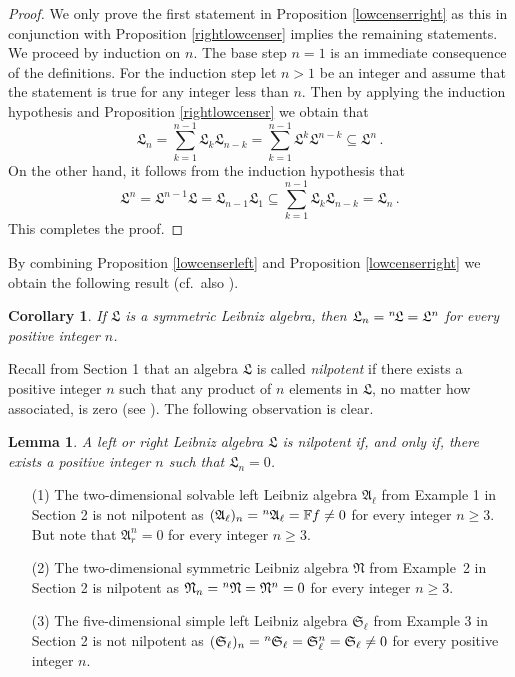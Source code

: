 \documentclass{amsart}
\newtheorem{lem}[thm]{Lemma}
\newtheorem{cor}[thm]{Corollary}
\numberwithin{equation}{section}
\newcommand{\F}{\mathbb{F}}
\newcommand{\af}{\mathfrak{A}}
\newcommand{\Sf}{\mathfrak{S}}
\newcommand{\lf}{\mathfrak{L}}
\newcommand{\nf}{\mathfrak{N}}
\begin{document}
\begin{proof}
We only prove the first statement in Proposition \ref{lowcenserright} as this in conjunction
with Proposition \ref{rightlowcenser} implies the remaining statements. We proceed by induction
on $n$. The base step $n=1$ is an immediate consequence of the definitions. For the induction
step let $n>1$ be an integer and assume that the statement is true for any integer less than
$n$. Then by applying the induction hypothesis and Proposition \ref{rightlowcenser} we obtain
that $$\lf_n=\sum_{k=1}^{n-1}\lf_k\lf_{n-k}=\sum_{k=1}^{n-1}\lf^k\lf^{n-k}\subseteq\lf^n
\,.$$ On the other hand, it follows from the induction hypothesis that $$\lf^n=\lf^{n-1}\lf=
\lf_{n-1}\lf_1\subseteq\sum_{k=1}^{n-1}\lf_k\lf_{n-k}=\lf_n\,.$$ This completes the proof.
\end{proof}

By combining Proposition \ref{lowcenserleft} and Proposition \ref{lowcenserright} we obtain the
following result (cf.\ also \cite[Proposition 2.13]{BH}).

\begin{cor}\label{lowcenser}
If $\lf$ is a symmetric Leibniz algebra, then $\lf_n=\hspace{.1mm}^n\hspace{-.5mm}\lf=\lf^n$
for every positive integer $n$.
\end{cor}

Recall from Section 1 that an algebra $\lf$ is called {\em nilpotent\/} if there exists a positive
integer $n$ such that any product of $n$ elements in $\lf$, no matter how associated, is zero
(see \cite[p. 18]{S}). The following observation is clear.

\begin{lem}\label{defnilp}
A left or right Leibniz algebra $\lf$ is nilpotent if, and only if, there exists a positive integer $n$
such that $\lf_n=0$.
\end{lem}

\begin{enumerate}
\item[(1)] The two-dimensional solvable left Leibniz algebra $\af_\ell$ from Example 1 in Section
                2 is not nilpotent as $(\af_\ell)_n=\hspace{.1mm}^n\hspace{-.1mm}\af_\ell=\F f\ne
                0$ for every integer $n\ge 3$. But note that $\af_r^n=0$ for every integer $n\ge 3$.
\item[(2)] The two-dimensional symmetric Leibniz algebra $\nf$ from Example~2 in Section 2 is
                nilpotent as $\nf_n=\hspace{.1mm}^n\hspace{-.1mm}\nf=\nf^n=0$ for every integer
                $n\ge 3$.
\item[(3)] The five-dimensional simple left Leibniz algebra $\Sf_\ell$ from Example 3 in Section 2
                 is not nilpotent as $(\Sf_\ell)_n=\hspace{.1mm}^n\hspace{-.1mm}\Sf_\ell=\Sf_\ell^n
                =\Sf_\ell\ne 0$ for every positive integer $n$.
\end{enumerate}
\vspace{.1cm}
\end{document}
